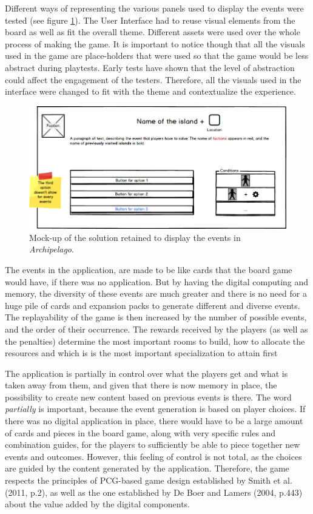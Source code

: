 Different ways of representing the various panels used to display the events were tested (see figure \ref{fig:uimockup}). The User Interface had to reuse visual elements from the board as well as fit the overall theme. Different assets were used over the whole process of making the game. It is important to notice though that all the visuals used in the game are place-holders that were used so that the game would be less abstract during playtests. Early tests have shown that the level of abstraction could affect the engagement of the testers. Therefore, all the visuals used in the interface were changed to fit with the theme and contextualize the experience.
\begin{figure}[h]
    \centering
    \includegraphics[width=\textwidth]{Images/event.png}
    \caption{Mock-up of the solution retained to display the events in \textit{Archipelago}.}
    \label{fig:uimockup}
\end{figure}

The events in the application, are made to be like cards that the board game would have, if there was no application. But by having the digital computing and memory, the diversity of these events are much greater and there is no need for a huge pile of cards and expansion packs to generate different and diverse events. The replayability of the game is then increased by the number of possible events, and the order of their occurrence. The rewards received by the players (as well as the penalties) determine the most important rooms to build, how to allocate the resources and which is is the most important specialization to attain first

The application is partially in control over what the players get and what is taken away from them, and given that there is now memory in place, the possibility to create new content based on previous events is there. The word \textit{partially} is important, because the event generation is based on player choices. If there was no digital application in place, there would have to be a large amount of cards and pieces in the board game, along with very specific rules and combination guides, for the players to sufficiently be able to piece together new events and outcomes. However, this feeling of control is not total, as the choices are guided by the content generated by the application. Therefore, the game respects the principles of PCG-based game design established by Smith et al. (2011, p.2)\cite{pdf:pcgbased}, as well as the one established by De Boer and Lamers (2004, p.443)\cite{chap:aug} about the value added by the digital components.

